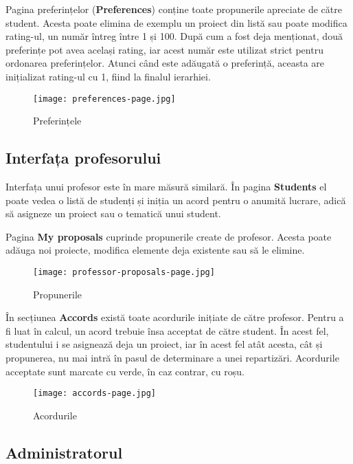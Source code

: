 Pagina preferințelor (\textbf{Preferences}) conține toate propunerile apreciate de către student. Acesta poate elimina de exemplu un proiect din listă sau poate modifica rating-ul, un număr întreg între 1 și 100. După cum a fost deja menționat, două preferințe pot avea același rating, iar acest număr este utilizat strict pentru ordonarea preferințelor. Atunci când este adăugată o preferință, aceasta are inițializat rating-ul cu 1, fiind la finalul ierarhiei.

\begin{figure}[H]
	\centering
	\texttt{[image: preferences-page.jpg]}
	\caption{Preferințele}
\end{figure}

\subsection{Interfața profesorului}

Interfața unui profesor este în mare măsură similară. În pagina \textbf{Students} el poate vedea o listă de studenți și iniția un acord pentru o anumită lucrare, adică să asigneze un proiect sau o tematică unui student.

Pagina \textbf{My proposals} cuprinde propunerile create de profesor. Acesta poate adăuga noi proiecte, modifica elemente deja existente sau să le elimine.

\begin{figure}[H]
	\centering
	\texttt{[image: professor-proposals-page.jpg]}
	\caption{Propunerile}
\end{figure}

În secțiunea \textbf{Accords} există toate acordurile inițiate de către profesor. Pentru a fi luat în calcul, un acord trebuie însa acceptat de către student. În acest fel, studentului i se asignează deja un proiect, iar în acest fel atât acesta, cât și propunerea, nu mai intră în pasul de determinare a unei repartizări. Acordurile acceptate sunt marcate cu verde, în caz contrar, cu roșu.

\begin{figure}[H]
	\centering
	\texttt{[image: accords-page.jpg]}
	\caption{Acordurile}
\end{figure}

\subsection{Administratorul}

